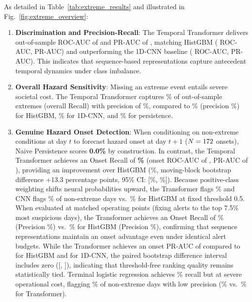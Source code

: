 \documentclass[conference]{IEEEtran}
\begin{document}
As detailed in Table~\ref{tab:extreme_results} and illustrated in Fig.~\ref{fig:extreme_overview}:
\begin{enumerate}
    \item \textbf{Discrimination and Precision-Recall}: The Temporal Transformer delivers out-of-sample ROC-AUC of \aucDeep{} and PR-AUC of \prAucDeep{}, matching HistGBM (\aucHgb{} ROC-AUC, \prAucHgb{} PR-AUC) and outperforming the 1D-CNN baseline (\aucCnn{} ROC-AUC, \prAucCnn{} PR-AUC). This indicates that sequence-based representations capture antecedent temporal dynamics under class imbalance.
    \item \textbf{Overall Hazard Sensitivity}: Missing an extreme event entails severe societal cost. The Temporal Transformer captures \recDeep{}\% of out-of-sample extremes (overall Recall) with precision of \precDeep{}\%, compared to \recHgb{}\% (precision \precHgb{}\%) for HistGBM, \recCnn{}\% for 1D-CNN, and \recPers{}\% for persistence.
    \item \textbf{Genuine Hazard Onset Detection}: When conditioning on non-extreme conditions at day $t$ to forecast hazard onset at day $t+1$ ($N = 172{}$ onsets), Naive Persistence scores \textbf{0.0\%} by construction. In contrast, the Temporal Transformer achieves an Onset Recall of \textbf{\onsetRecDeep{}\%} (onset ROC-AUC of \onsetAucDeep{}, PR-AUC of \onsetPrAucDeep{}), providing an improvement over HistGBM (\onsetRecHgb{}\%, moving-block bootstrap difference +13.3 percentage points, 95\% CI: [\ciOnsetRecHgbLow{}\%, \ciOnsetRecHgbHigh{}\%]). Because positive-class weighting shifts neural probabilities upward, the Transformer flags \onsetFlaggedDeep{}\% and CNN flags \onsetFlaggedCnn{}\% of non-extreme days vs.~\onsetFlaggedHgb{}\% for HistGBM at fixed threshold 0.5. When evaluated at matched operating points (fixing alerts to the top 7.5\% most suspicious days), the Transformer achieves an Onset Recall of \onsetRecMatchedDeep{}\% (Precision \onsetPrecMatchedDeep{}\%) vs.~\onsetRecMatchedHgb{}\% for HistGBM (Precision \onsetPrecMatchedHgb{}\%), confirming that sequence representations maintain an onset advantage even under identical alert budgets. While the Transformer achieves an onset PR-AUC of \onsetPrAucDeep{} compared to \onsetPrAucHgb{} for HistGBM and \onsetPrAucCnn{} for 1D-CNN, the paired bootstrap difference interval includes zero ([\ciOnsetPrAucHgbLow{}, \ciOnsetPrAucHgbHigh{}]), indicating that threshold-free ranking quality remains statistically tied. Terminal logistic regression achieves \onsetRecLr{}\% recall but at severe operational cost, flagging \onsetFlaggedLr{}\% of non-extreme days with low precision (\onsetPrecLr{}\% vs.~\onsetPrecDeep{}\% for Transformer).

\end{enumerate}
\end{document}

